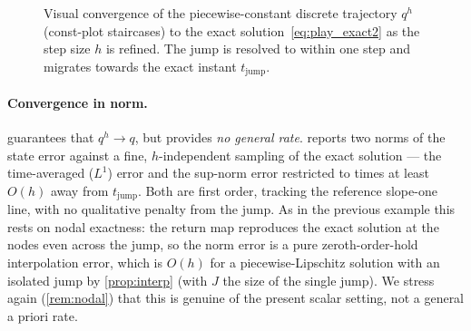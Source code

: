\begin{figure}[t]
  \centering
  \caption{Visual convergence of the piecewise-constant discrete
  trajectory $q^h$ (const-plot staircases) to the exact
  solution~\eqref{eq:play_exact2} as the step size $h$ is refined. The
  jump is resolved to within one step and migrates towards the exact
  instant $t_{\mathrm{jump}}$.}
  \label{fig:traj2}
\end{figure}

\paragraph{Convergence in norm.}  guarantees that
$q^h\to q$, but provides \emph{no general rate}. 
reports two norms of the state error against a fine, $h$-independent
sampling of the exact solution --- the time-averaged ($L^1$) error and
the sup-norm error restricted to times at least $O(h)$ away from
$t_{\mathrm{jump}}$. Both are first order, tracking the reference
slope-one line, with no qualitative penalty from the jump. As in the
previous example this rests on nodal exactness: the return map
reproduces the exact solution at the nodes even across the jump, so the
norm error is a pure zeroth-order-hold interpolation error, which is
$O(h)$ for a piecewise-Lipschitz solution with an isolated jump by
\cref{prop:interp} (with $J$ the size of the single jump). We stress
again (\cref{rem:nodal}) that this is genuine of the present scalar
setting, not a general a priori rate.

